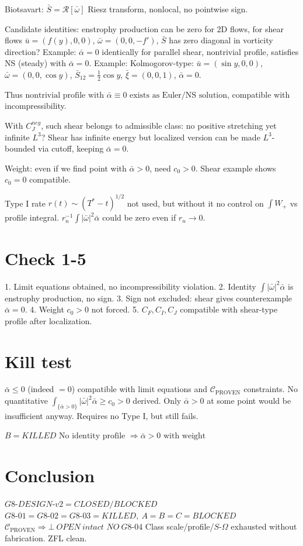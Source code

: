 \documentclass[11pt]{article}
\begin{document}
Biotsavart: $\bar S=\mathcal R[\bar\omega]$ Riesz transform, nonlocal, no pointwise sign.

Candidate identities: enstrophy production can be zero for 2D flows, for shear flows $\bar u=(f(y),0,0)$, $\bar\omega=(0,0,-f')$, $\bar S$ has zero diagonal in vorticity direction? Example: $\bar\alpha=0$ identically for parallel shear, nontrivial profile, satisfies NS (steady) with $\bar\alpha=0$.
Example: Kolmogorov-type: $\bar u=(\sin y,0,0)$, $\bar\omega=(0,0,\cos y)$, $\bar S_{12}=\frac12\cos y$, $\bar\xi=(0,0,1)$, $\bar\alpha=0$.

Thus $\boxed{\text{nontrivial profile with }\bar\alpha\equiv0\text{ exists as Euler/NS solution}}$, compatible with incompressibility.

With $C_J^{neg}$, such shear belongs to admissible class: no positive stretching yet infinite $L^3$? Shear has infinite energy but localized version can be made $L^3$-bounded via cutoff, keeping $\bar\alpha=0$.

Weight: even if we find point with $\bar\alpha>0$, need $c_0>0$. Shear example shows $c_0=0$ compatible.

Type I rate $r(t)\sim(T^*-t)^{1/2}$ not used, but without it no control on $\int W_+$ vs profile integral. $r_n^{-1}\int|\bar\omega|^2\bar\alpha$ could be zero even if $r_n\to0$.

\section{Check 1-5}
1. Limit equations obtained, no incompressibility violation.
2. Identity $\int|\bar\omega|^2\bar\alpha$ is enstrophy production, no sign.
3. Sign not excluded: shear gives counterexample $\bar\alpha=0$.
4. Weight $c_0>0$ not forced.
5. $C_F,C_I,C_J$ compatible with shear-type profile after localization.

\section{Kill test}
$\bar\alpha\le0$ (indeed $=0$) compatible with limit equations and $\mathcal C_{\mathrm{PROVEN}}$ constraints.
No quantitative $\int_{\{\bar\alpha>0\}}|\bar\omega|^2\bar\alpha\ge c_0>0$ derived.
Only $\bar\alpha>0$ at some point would be insufficient anyway.
Requires no Type I, but still fails.

$\boxed{B=KILLED}$
$\boxed{\text{No identity profile }\Rightarrow\bar\alpha>0\text{ with weight}}$

\section{Conclusion}
$\boxed{G8\text{-}DESIGN\text{-}v2=CLOSED/BLOCKED}$
$\boxed{G8\text{-}01=G8\text{-}02=G8\text{-}03=KILLED,\ A=B=C=BLOCKED}$
$\boxed{\mathcal C_{\mathrm{PROVEN}}\Rightarrow\bot\ OPEN\ intact}$
$\boxed{NO\ G8\text{-}04}$
Class scale/profile/$S$-$\Omega$ exhausted without fabrication. ZFL clean.
\end{document}
